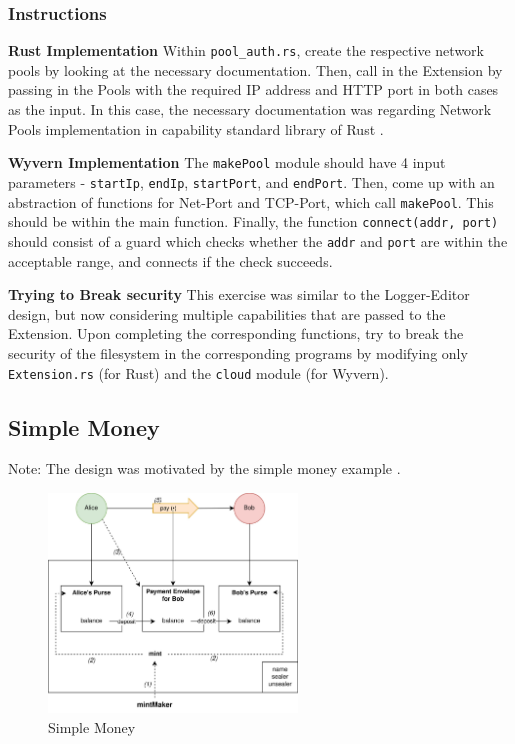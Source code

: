 \subsubsection{Instructions}
\noindent
\textbf{Rust Implementation} Within \texttt{pool\_auth.rs}, create the respective network pools by looking at the necessary documentation. Then, call in the Extension by passing in the Pools with the required IP address and HTTP port in both cases as the input. In this case, the necessary documentation was regarding Network Pools implementation  in capability standard library of Rust \cite{libcaprustpool}.
 

\noindent
\textbf{Wyvern Implementation} The \texttt{makePool} module should have 4 input parameters - \texttt{startIp}, \texttt{endIp}, \texttt{startPort}, and \texttt{endPort}.
Then, come up with an abstraction of functions for Net-Port and TCP-Port, which call \texttt{makePool}. This should be within the main function.
Finally, the function \texttt{connect(addr, port)} should consist of a guard which checks whether the \texttt{addr} and \texttt{port} are within the acceptable range, and connects if the check succeeds.

\noindent
\textbf{Trying to Break security} This exercise was similar to the Logger-Editor design, but now considering multiple capabilities that are passed to the Extension. Upon completing the corresponding functions, try to break the security of the filesystem in the corresponding programs by modifying only \texttt{Extension.rs} (for Rust) and the \texttt{cloud} module (for Wyvern).

\subsection{Simple Money} \label{sec:simpleMoney}
\noindent
Note: The design was motivated by the simple money example \cite{millerFinancial}.

\begin{figure}[htbp]
\centering
\includegraphics[width=2.6in]{figures/simpleMoney.jpg}
\caption{\label{fig:simpleMoney} Simple Money}
\end{figure}

